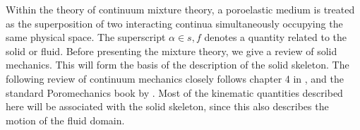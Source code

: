 Within the theory of continuum mixture theory, a poroelastic medium is treated as the superposition of
two interacting continua simultaneously occupying the same physical space. The
superscript $\alpha \in {s, f}$ denotes a quantity related to the solid or fluid.  Before presenting the mixture theory, we give a review of solid mechanics. This will form the basis of the description of the solid skeleton. The following review of continuum mechanics closely follows chapter 4 in \citet{gonzalez2008first}, and the standard Poromechanics book by \citet{coussy2004poromechanics}. Most of the kinematic quantities described here will be associated with the solid skeleton, since this also describes the motion of the fluid domain.
\begin{figure}[H]
\begin{center}

\end{center}
\end{figure}
